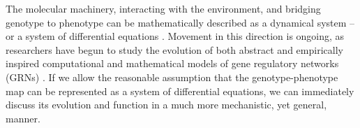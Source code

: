 \documentclass{article}
\newcommand{\1}{\mathbbm{1}}
\begin{document}



The molecular machinery, interacting with the environment, and bridging genotype to phenotype
can be mathematically described as a dynamical system -- or a system of differential equations \citep{jaeger2015comet}.
 Movement in this direction is ongoing, as researchers have begun to study 
the evolution of both abstract \citep{wagner1994evolution, wagner1996does,  siegal2002waddington, bergman2003evolutionary, draghi2015robustness} and empirically inspired computational and mathematical models of gene regulatory networks (GRNs) \citep{mjolsness1991connectionist, jaeger2004dynamic, maria1, vitaly1, vitaly2, crombach2016gap, wotton2015quantitative, chertkova2017insilico}. If we allow the reasonable assumption that the genotype-phenotype map can be represented as a system of differential equations, we can immediately discuss its evolution and function in a much more mechanistic, yet general, manner. 
\end{document}
